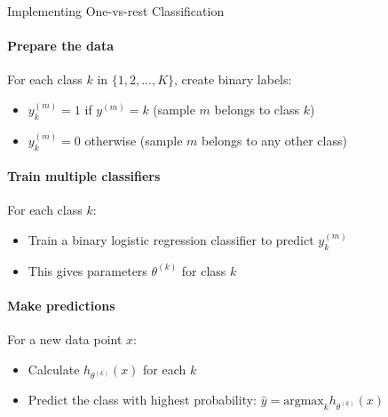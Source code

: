 \begin{KR}{Implementing One-vs-rest Classification}\\
\paragraph{Prepare the data}
For each class $k$ in $\{1, 2, ..., K\}$, create binary labels:
\begin{itemize}
    \item $y^{(m)}_k = 1$ if $y^{(m)} = k$ (sample $m$ belongs to class $k$)
    \item $y^{(m)}_k = 0$ otherwise (sample $m$ belongs to any other class)
\end{itemize}

\paragraph{Train multiple classifiers}
For each class $k$:
\begin{itemize}
    \item Train a binary logistic regression classifier to predict $y^{(m)}_k$
    \item This gives parameters $\theta^{(k)}$ for class $k$
\end{itemize}

\paragraph{Make predictions}
For a new data point $x$:
\begin{itemize}
    \item Calculate $h_{\theta^{(k)}}(x)$ for each $k$
    \item Predict the class with highest probability: $\hat{y} = \text{argmax}_k h_{\theta^{(k)}}(x)$
\end{itemize}
\end{KR}

